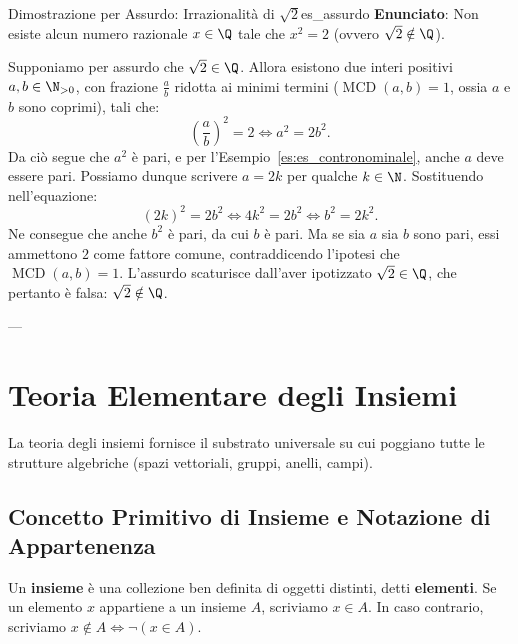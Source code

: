 \begin{esempio}{Dimostrazione per Assurdo: Irrazionalità di $\sqrt{2}$}{es_assurdo}
\textbf{Enunciato}: Non esiste alcun numero razionale $x \in \Q$ tale che $x^2 = 2$ (ovvero $\sqrt{2} \notin \Q$).
\begin{dimostrazione}
Supponiamo per assurdo che $\sqrt{2} \in \Q$. Allora esistono due interi positivi $a, b \in \N_{>0}$, con frazione $\frac{a}{b}$ ridotta ai minimi termini ($\operatorname{MCD}(a, b) = 1$, ossia $a$ e $b$ sono coprimi), tali che:
\begin{equation}
    \left(\frac{a}{b}\right)^2 = 2 \iff a^2 = 2b^2.
\end{equation}
Da ciò segue che $a^2$ è pari, e per l'Esempio~\ref{es:es_contronominale}, anche $a$ deve essere pari. Possiamo dunque scrivere $a = 2k$ per qualche $k \in \N$.
Sostituendo nell'equazione:
\begin{equation}
    (2k)^2 = 2b^2 \iff 4k^2 = 2b^2 \iff b^2 = 2k^2.
\end{equation}
Ne consegue che anche $b^2$ è pari, da cui $b$ è pari.
Ma se sia $a$ sia $b$ sono pari, essi ammettono $2$ come fattore comune, contraddicendo l'ipotesi che $\operatorname{MCD}(a, b) = 1$.
L'assurdo scaturisce dall'aver ipotizzato $\sqrt{2} \in \Q$, che pertanto è falsa: $\sqrt{2} \notin \Q$.
\end{dimostrazione}
\end{esempio}

---

\section{Teoria Elementare degli Insiemi}

La teoria degli insiemi fornisce il substrato universale su cui poggiano tutte le strutture algebriche (spazi vettoriali, gruppi, anelli, campi).

\subsection{Concetto Primitivo di Insieme e Notazione di Appartenenza}
Un \textbf{insieme} è una collezione ben definita di oggetti distinti, detti \textbf{elementi}.
Se un elemento $x$ appartiene a un insieme $A$, scriviamo $x \in A$. In caso contrario, scriviamo $x \notin A \iff \neg(x \in A)$.

